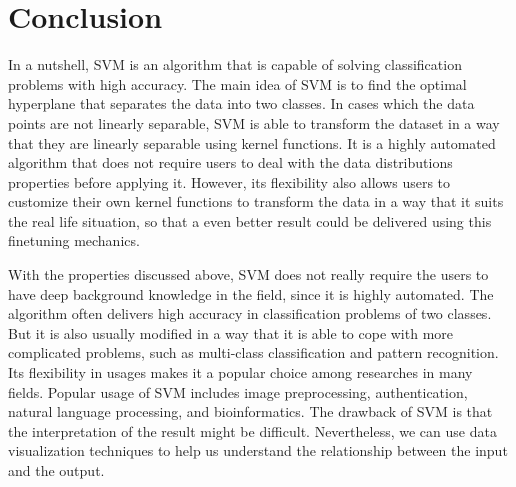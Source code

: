 
\section{Conclusion}
In a nutshell, SVM is an algorithm that is capable of solving classification
problems with high accuracy. The main idea of SVM is to find the optimal
hyperplane that separates the data into two classes. In cases which the data
points are not linearly separable, SVM is able to transform 
the dataset in a way that they are linearly separable using kernel functions.
It is a highly automated algorithm that does not require users to deal with
the data distributions properties before applying it. However, its flexibility
also allows users to customize their own kernel functions to transform the data
in a way that it suits the real life situation, so that a even better result
could be delivered using this finetuning mechanics.

With the properties discussed above, SVM does not really require the users to have deep background
knowledge in the field, since it is highly automated.
The algorithm often delivers high accuracy in classification
problems of two classes. But it is also usually modified in a way that it is able
to cope with more complicated problems, such as multi-class classification and
pattern recognition. Its flexibility in usages makes it a popular choice among
researches in many fields. 
Popular usage of SVM includes image preprocessing, authentication, natural language
processing, and bioinformatics.
The drawback of SVM is that the interpretation of the
result might be difficult. Nevertheless, we can use data visualization techniques
to help us understand the relationship between the input and the output.
